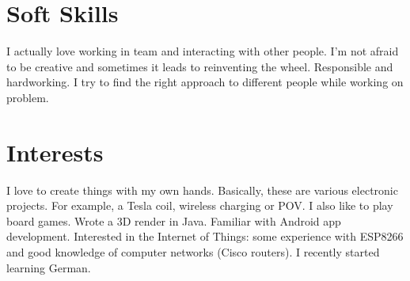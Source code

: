 \documentclass[]{cv-style}          %
\begin{document}

\section{Soft Skills}
{\vspace{0.1cm}}
I actually love working in team and interacting with other people. I'm not afraid to be creative and sometimes it leads to reinventing the wheel. Responsible and hardworking. I try to find the right approach to different people while working on problem.


\section{Interests}

\begin{entrylist}
\entry
{}
{{\normalfont 
I love to create things with my own hands. Basically, these are various electronic projects. For example, a Tesla coil, wireless charging or POV. I also like to play board games. Wrote a 3D render in Java. Familiar with Android app development. Interested in the Internet of Things: some experience with ESP8266 and good knowledge of computer networks (Cisco routers). I recently started learning German.}}
{}
{}
\end{entrylist}
\end{document}
